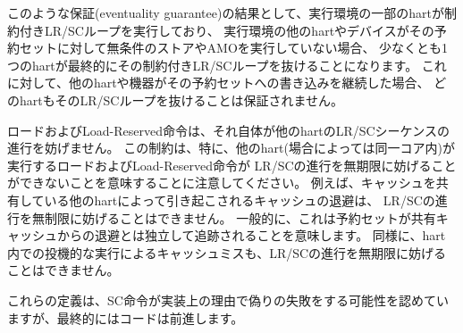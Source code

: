 \begin{commentary}
\begin{comment}
As a consequence of the eventuality guarantee, if some harts in an execution
environment are executing constrained LR/SC loops, and no other harts or
devices in the execution environment execute an unconditional store or AMO to
that reservation set, then at least one hart will eventually exit its
constrained LR/SC loop.
By contrast, if other harts or devices continue to write to that reservation
set, it is not guaranteed that any hart will exit its LR/SC loop.
\end{comment}

このような保証(eventuality guarantee)の結果として、実行環境の一部のhartが制約付きLR/SCループを実行しており、
実行環境の他のhartやデバイスがその予約セットに対して無条件のストアやAMOを実行していない場合、
少なくとも1つのhartが最終的にその制約付きLR/SCループを抜けることになります。
これに対して、他のhartや機器がその予約セットへの書き込みを継続した場合、
どのhartもそのLR/SCループを抜けることは保証されません。

\begin{comment}
Loads and load-reserved instructions do not by themselves impede the progress
of other harts' LR/SC sequences.
We note this constraint implies, among other things, that loads and
load-reserved instructions executed by other harts (possibly within the same
core) cannot impede LR/SC progress indefinitely.
For example, cache evictions caused by another hart sharing the cache cannot
impede LR/SC progress indefinitely.
Typically, this implies reservations are tracked independently of
evictions from any shared cache.
Similarly, cache misses caused by speculative execution within a hart cannot
impede LR/SC progress indefinitely.
\end{comment}

ロードおよびLoad-Reserved命令は、それ自体が他のhartのLR/SCシーケンスの進行を妨げません。
この制約は、特に、他のhart(場合によっては同一コア内)が実行するロードおよびLoad-Reserved命令が
LR/SCの進行を無期限に妨げることができないことを意味することに注意してください。
例えば、キャッシュを共有している他のhartによって引き起こされるキャッシュの退避は、
LR/SCの進行を無制限に妨げることはできません。
一般的に、これは予約セットが共有キャッシュからの退避とは独立して追跡されることを意味します。
同様に、hart内での投機的な実行によるキャッシュミスも、LR/SCの進行を無期限に妨げることはできません。

\begin{comment}
These definitions admit the possibility that SC instructions may spuriously
fail for implementation reasons, provided progress is eventually made.
\end{comment}
これらの定義は、SC命令が実装上の理由で偽りの失敗をする可能性を認めていますが、最終的にはコードは前進します。
\end{commentary}

